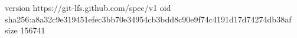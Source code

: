 version https://git-lfs.github.com/spec/v1
oid sha256:a8a32c9e319451efec3bb70e34954cb3bdd8c90e9f74c4191d17d74274db38af
size 156741

